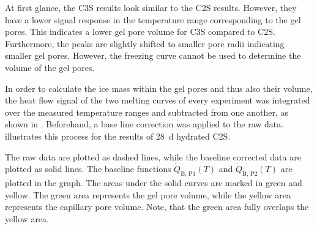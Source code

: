 At first glance, the \ac{C3S} results look similar to the \ac{C2S} results.
However, they have a lower signal response in the temperature range corresponding to the gel pores.
This indicates a lower gel pore volume for \ac{C3S} compared to \ac{C2S}.
Furthermore, the peaks are slightly shifted to smaller pore radii indicating smaller gel pores.
However, the freezing curve cannot be used to determine the volume of the gel pores.

In order to calculate the ice mass within the gel pores and thus also their volume, the heat flow signal of the two melting curves of every experiment was integrated over the measured temperature ranges and subtracted from one another, as shown in .
Beforehand, a base line correction was applied to the raw data.
 illustrates this process for the results of \qty{28}{\day} hydrated \ac{C2S}.

The raw data are plotted as dashed lines, while the baseline corrected data are plotted as solid lines.
The baseline functions $\dot{Q}_\text{B, P1}(T)$ and $\dot{Q}_\text{B, P2}(T)$ are plotted in the graph.
The areas under the solid curves are marked in green and yellow.
The green area represents the gel pore volume, while the yellow area represents the capillary pore volume.
Note, that the green area fully overlaps the yellow area.


